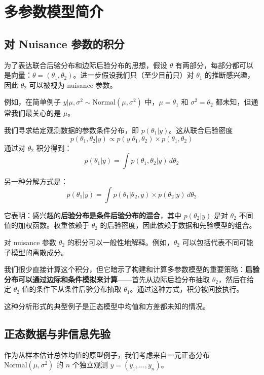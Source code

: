 
\chapter{多参数模型简介}

\section{对 Nuisance 参数的积分}

为了表达联合后验分布和边际后验分布的思想，假设 $\theta$ 有两部分，每部分都可以是向量：$\theta = (\theta_1, \theta_2)$。进一步假设我们只（至少目前只）对 $\theta_1$ 的推断感兴趣，因此 $\theta_2$ 可以被视为 nuisance 参数。

例如，在简单例子 $y|\mu, \sigma^2 \sim \text{Normal}(\mu, \sigma^2)$ 中，$\mu = \theta_1$ 和 $\sigma^2 = \theta_2$ 都未知，但通常我们最关心的是 $\mu$。

我们寻求给定观测数据的参数条件分布，即 $p(\theta_1|y)$。这从联合后验密度
\[
p(\theta_1, \theta_2|y) \propto p(y|\theta_1, \theta_2) \times p(\theta_1, \theta_2)
\]
通过对 $\theta_2$ 积分得到：
\[
p(\theta_1|y) = \int p(\theta_1, \theta_2|y) \, d\theta_2
\]

另一种分解方式是：
\[
p(\theta_1|y) = \int p(\theta_1|\theta_2, y) \times p(\theta_2|y) \, d\theta_2
\]

它表明：感兴趣的\textbf{后验分布是条件后验分布的混合}，其中 $p(\theta_2|y)$ 是对 $\theta_2$ 不同值的加权函数。权重依赖于 $\theta_2$ 的后验密度，因此依赖于数据和先验模型的组合。

对 nuisance 参数 $\theta_2$ 的积分可以一般性地解释。例如，$\theta_2$ 可以包括代表不同可能子模型的离散成分。

\begin{Remark}
  我们很少直接计算这个积分，但它暗示了构建和计算多参数模型的重要策略：\textbf{后验分布可以通过边际和条件模拟来计算}——首先从边际后验分布抽取 $\theta_2$，然后在给定 $\theta_2$ 值的条件下从条件后验分布抽取 $\theta_1$。通过这种方式，积分被间接执行。
\end{Remark}

这种分析形式的典型例子是正态模型中均值和方差都未知的情况。

\section{正态数据与非信息先验}

作为从样本估计总体均值的原型例子，我们考虑来自一元正态分布 $\text{Normal}(\mu, \sigma^2)$ 的 $n$ 个独立观测 $y = (y_1, \ldots, y_n)$。


